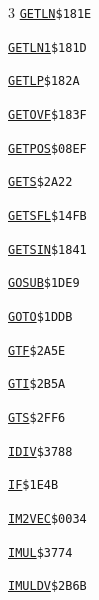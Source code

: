 \begin{multicols}{3}
\noindent\hyperlink{l:GETLN}{\texttt{GETLN}}\hfill\texttt{\$181E~\phantom{000}\llap{\pageref{l:GETLN}}}\par
\noindent\hyperlink{l:GETLN1}{\texttt{GETLN1}}\hfill\texttt{\$181D~\phantom{000}\llap{\pageref{l:GETLN1}}}\par
\noindent\hyperlink{l:GETLP}{\texttt{GETLP}}\hfill\texttt{\$182A~\phantom{000}\llap{\pageref{l:GETLP}}}\par
\noindent\hyperlink{l:GETOVF}{\texttt{GETOVF}}\hfill\texttt{\$183F~\phantom{000}\llap{\pageref{l:GETOVF}}}\par
\noindent\hyperlink{l:GETPOS}{\texttt{GETPOS}}\hfill\texttt{\$08EF~\phantom{000}\llap{\pageref{l:GETPOS}}}\par
\noindent\hyperlink{l:GETS}{\texttt{GETS}}\hfill\texttt{\$2A22~\phantom{000}\llap{\pageref{l:GETS}}}\par
\noindent\hyperlink{l:GETSFL}{\texttt{GETSFL}}\hfill\texttt{\$14FB~\phantom{000}\llap{\pageref{l:GETSFL}}}\par
\noindent\hyperlink{l:GETSIN}{\texttt{GETSIN}}\hfill\texttt{\$1841~\phantom{000}\llap{\pageref{l:GETSIN}}}\par
\noindent\hyperlink{l:GOSUB}{\texttt{GOSUB}}\hfill\texttt{\$1DE9~\phantom{000}\llap{\pageref{l:GOSUB}}}\par
\noindent\hyperlink{l:GOTO}{\texttt{GOTO}}\hfill\texttt{\$1DDB~\phantom{000}\llap{\pageref{l:GOTO}}}\par
\noindent\hyperlink{l:GTF}{\texttt{GTF}}\hfill\texttt{\$2A5E~\phantom{000}\llap{\pageref{l:GTF}}}\par
\noindent\hyperlink{l:GTI}{\texttt{GTI}}\hfill\texttt{\$2B5A~\phantom{000}\llap{\pageref{l:GTI}}}\par
\noindent\hyperlink{l:GTS}{\texttt{GTS}}\hfill\texttt{\$2FF6~\phantom{000}\llap{\pageref{l:GTS}}}\par
\noindent\hyperlink{l:IDIV}{\texttt{IDIV}}\hfill\texttt{\$3788~\phantom{000}\llap{\pageref{l:IDIV}}}\par
\noindent\hyperlink{l:IF}{\texttt{IF}}\hfill\texttt{\$1E4B~\phantom{000}\llap{\pageref{l:IF}}}\par
\noindent\hyperlink{l:IM2VEC}{\texttt{IM2VEC}}\hfill\texttt{\$0034~\phantom{000}\llap{\pageref{l:IM2VEC}}}\par
\noindent\hyperlink{l:IMUL}{\texttt{IMUL}}\hfill\texttt{\$3774~\phantom{000}\llap{\pageref{l:IMUL}}}\par
\noindent\hyperlink{l:IMULDV}{\texttt{IMULDV}}\hfill\texttt{\$2B6B~\phantom{000}\llap{\pageref{l:IMULDV}}}\par

\end{multicols}
